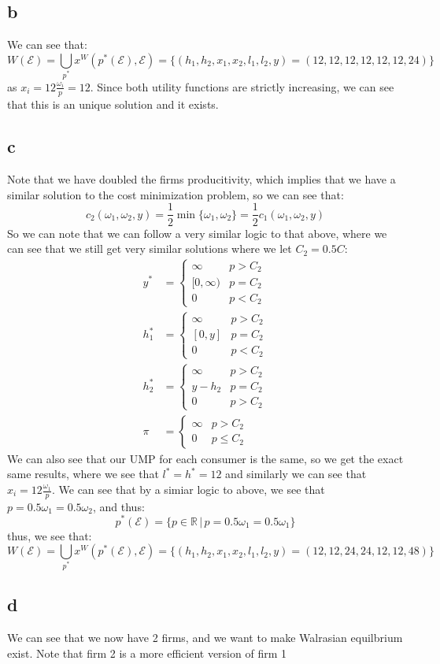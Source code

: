 \documentclass[11pt]{article}
\newcommand{\R}{\mathbb{R}}
\begin{document}
\subsection*{b}
We can see that:
\[
    W(\mathcal{E}) = \bigcup_{p^*} x^W(p^*(\mathcal{E}), \mathcal{E}) = \{(h_1, h_2, x_1, x_2, l_1, l_2, y) = (12,12,12,12,12, 12 ,24)\}
\]
as $x_i = 12\frac{\omega_i}{p} = 12$. Since both utility functions are strictly increasing, we can see that this is an unique solution and it exists. 
\subsection*{c}
Note that we have doubled the firms producitivity, which implies that we have a similar solution to the cost minimization problem, so we can see that:
\[
c_2(\omega_1, \omega_2, y) = \frac{1}{2}\min \{ \omega_1, \omega_2\} = \frac{1}{2}c_1(\omega_1, \omega_2, y)
\]
So we can note that we can follow a very similar logic to that above, where we can see that we still  get very similar solutions where we let $C_2 = 0.5C$:
\begin{align*}
    y^* &= \begin{cases}
        \infty & p > C_2\\
        [0,\infty) & p = C_2\\
        0 & p < C_2
    \end{cases}\\
    h_1^* &= \begin{cases}
        \infty & p>C_2\\
        [0, y] & p = C_2\\
        0 & p < C_2
    \end{cases}\\
    h_2^* &= \begin{cases}
        \infty & p > C_2\\
        y - h_2 & p = C_2\\
        0 & p > C_2
    \end{cases}\\
    \pi &= \begin{cases}
        \infty & p > C_2\\
        0 & p \leq C_2
    \end{cases}
\end{align*}
We can also see that our UMP for each consumer is the same, so we get the exact same results, where we see that $l^* = h^* = 12$ and similarly we can see that $x_i = 12\frac{\omega_1}{p}$. We can see that by a simiar logic to above, we see that $p = 0.5\omega_1 = 0.5\omega_2$, and thus:
\[
p^*(\mathcal{E}) = \{ p \in \R \hspace{2pt} | \hspace{2pt} p = 0.5\omega_1 = 0.5\omega_1\}
\]
thus, we see that:
\[
W(\mathcal{E}) = \bigcup_{p^*} x^W(p^*(\mathcal{E}), \mathcal{E}) = \{(h_1, h_2, x_1, x_2, l_1, l_2, y) = (12,12,24,24,12, 12 ,48)\}
\]
\subsection*{d}
We can see that we now have 2 firms, and we want to make Walrasian equilbrium exist. Note that firm 2 is a more efficient version of firm 1
\end{document}
